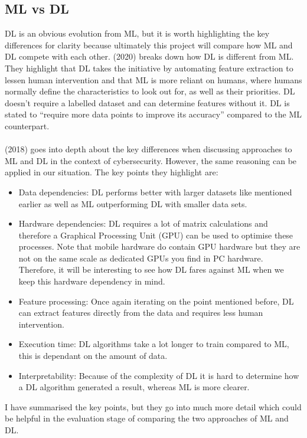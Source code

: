 \documentclass{article}
\begin{document}
\subsection{ML vs DL}
DL is an obvious evolution from ML, but it is worth highlighting the key differences for clarity because ultimately this 
project will compare how ML and DL compete with each other. \citeauthor{kav2020} (2020) breaks down how DL is different from ML. 
They highlight that DL takes the initiative by automating feature extraction to lessen human intervention and that ML is
 more reliant on humans, where humans normally define the characteristics to look out for, as well as their priorities. 
 DL doesn’t require a labelled dataset and can determine features without it. DL is stated to “require more data points 
 to improve its accuracy” compared to the ML counterpart.
 \\
 \\
 \citeauthor{8359287} (2018) goes into depth about the key differences when discussing approaches to ML and DL in the context
  of cybersecurity. However, the same reasoning can be applied in our situation. The key points they highlight are:
  \begin{itemize}
      \item Data dependencies: DL performs better with larger datasets like mentioned earlier as well as ML 
      outperforming DL with smaller data sets.
      \item Hardware dependencies: DL requires a lot of matrix calculations and therefore a Graphical Processing 
      Unit (GPU) can be used to optimise these processes. Note that mobile hardware do contain GPU hardware but they are
       not on the same scale as dedicated GPUs you find in PC hardware. Therefore, it will be interesting to see how DL 
       fares against ML when we keep this hardware dependency in mind.
    \item Feature processing: Once again iterating on the point mentioned before, DL can extract features directly 
    from the data and requires less human intervention.
    \item Execution time: DL algorithms take a lot longer to train compared to ML, this is dependant on the amount of 
    data.
    \item Interpretability: Because of the complexity of DL it is hard to determine how a DL algorithm generated a 
    result, whereas ML is more clearer.
  \end{itemize}
  I have summarised the key points, but they go into much more detail which could be helpful in the evaluation stage 
    of comparing the two approaches of ML and DL.
\end{document}
